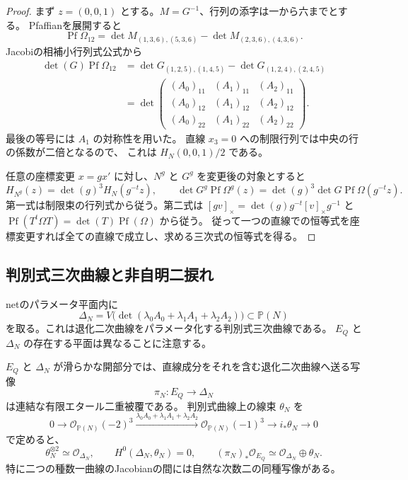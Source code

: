 \begin{proof}
まず $z=(0,0,1)$ とする。$M=G^{-1}$、行列の添字は一から六までとする。
Pfaffianを展開すると
\[
 \operatorname{Pf}\Omega_{12}
 =\det M_{(1,3,6),(5,3,6)}
  -\det M_{(2,3,6),(4,3,6)}.
\]
Jacobiの相補小行列式公式から
\begin{align*}
 \det(G)\operatorname{Pf}\Omega_{12}
 &=\det G_{(1,2,5),(1,4,5)}
   -\det G_{(1,2,4),(2,4,5)}\\
 &=\det\begin{pmatrix}
 (A_0)_{11}&(A_1)_{11}&(A_2)_{11}\\
 (A_0)_{12}&(A_1)_{12}&(A_2)_{12}\\
 (A_0)_{22}&(A_1)_{22}&(A_2)_{22}
 \end{pmatrix}.
\end{align*}
最後の等号には $A_1$ の対称性を用いた。
直線 $x_3=0$ への制限行列では中央の行の係数が二倍となるので、
これは $H_N(0,0,1)/2$ である。

任意の座標変更 $x=gx'$ に対し、$N^g$ と $G^g$ を変更後の対象とすると
\[
 H_{N^g}(z)=\det(g)^3H_N(g^{-t}z),\qquad
 \det G^g\operatorname{Pf}\Omega^g(z)
 =\det(g)^3\det G\operatorname{Pf}\Omega(g^{-t}z).
\]
第一式は制限束の行列式から従う。第二式は
$[gv]_\times=\det(g)g^{-t}[v]_\times g^{-1}$ と
$\operatorname{Pf}(T^t\Omega T)=\det(T)\operatorname{Pf}(\Omega)$ から従う。
従って一つの直線での恒等式を座標変更すれば全ての直線で成立し、求める三次式の恒等式を得る。
\end{proof}

\subsection{判別式三次曲線と非自明二捩れ}

netのパラメータ平面内に
\[
 \Delta_N=V\bigl(\det(\lambda_0A_0+\lambda_1A_1+\lambda_2A_2)\bigr)
 \subset\mathbb P(N)
\]
を取る。これは退化二次曲線をパラメータ化する判別式三次曲線である。
$E_Q$ と $\Delta_N$ の存在する平面は異なることに注意する。

\begin{theorem}[Hermite曲線のエタール二重被覆]
\label{thm:hermite-double-cover-v27}
$E_Q$ と $\Delta_N$ が滑らかな開部分では、直線成分をそれを含む退化二次曲線へ送る写像
\[
 \pi_N:E_Q\longrightarrow\Delta_N
\]
は連結な有限エタール二重被覆である。
判別式曲線上の線束 $\theta_N$ を
\[
 0\longrightarrow\mathcal O_{\mathbb P(N)}(-2)^3
 \xrightarrow{\lambda_0A_0+\lambda_1A_1+\lambda_2A_2}
 \mathcal O_{\mathbb P(N)}(-1)^3
 \longrightarrow i_*\theta_N\longrightarrow0
\]
で定めると、
\[
 \theta_N^{\otimes2}\simeq\mathcal O_{\Delta_N},\qquad
 H^0(\Delta_N,\theta_N)=0,\qquad
 (\pi_N)_*\mathcal O_{E_Q}\simeq\mathcal O_{\Delta_N}\oplus\theta_N.
\]
特に二つの種数一曲線のJacobianの間には自然な次数二の同種写像がある。
\end{theorem}

